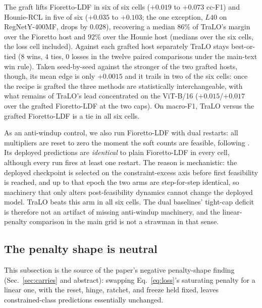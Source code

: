 \documentclass[10pt]{article}
\begin{document}
The graft lifts Fioretto-LDF in six of six cells ($+0.019$ to $+0.073$
cc-F1) and Hounie-RCL in five of six ($+0.035$ to $+0.103$; the one
exception, $L40$ on RegNet{\color{blue}Y-400MF}, drops by $0.028$), recovering a median
$86\%$ of TraLO's margin over the Fioretto host and $92\%$ over the
Hounie host (medians over the six cells, the loss cell included).
Against each grafted host separately TraLO stays best-or-tied ($8$
wins, $4$ ties, $0$ losses in the twelve paired comparisons under the
main-text win rule). Taken seed-by-seed against the stronger of the two
grafted hosts, though, its mean edge is only $+0.0015$ and it trails in
two of the six cells: once the recipe is grafted the three methods are
statistically interchangeable, with what remains of TraLO's lead
concentrated on the ViT-B/16 ($+0.015$/$+0.017$ over the grafted
Fioretto-LDF at the two caps). On macro-F1, TraLO versus the grafted
Fioretto-LDF is a tie in all six cells.

As an anti-windup control, we also run Fioretto-LDF with dual restarts:
all multipliers are reset to zero the moment the soft counts are
feasible, following \citet{gallego2022controlled}. Its deployed
predictions are \emph{identical} to plain Fioretto-LDF in every cell,
although every run fires at least one restart. The reason is
mechanistic: the deployed checkpoint is selected on the
constraint-excess axis before first feasibility is reached, and up to
that epoch the two arms are step-for-step identical, so machinery that
only alters post-feasibility dynamics cannot change the deployed model.
TraLO beats this arm in all six cells. The dual baselines' tight-cap
deficit is therefore not an artifact of missing anti-windup machinery,
and the linear-penalty comparison in the main grid is not a strawman in
that sense.

\subsection{The penalty shape is neutral}
\label{app:shape}

This subsection is the source of the paper's negative penalty-shape
finding (Sec.~\ref{sec:carries} and abstract): swapping
Eq.~\eqref{eq:loss}'s saturating penalty for a linear one, with the
reset, hinge, ratchet, and freeze held fixed, leaves constrained-class
predictions essentially unchanged.
\end{document}
